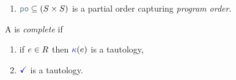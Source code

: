 \begin{definition}
\begin{enumerate}[,label=(\textsc{m}\arabic*),ref=\textsc{m}\arabic*]
\begin{multicols}{2}
\begin{enumerate}
    \item \label{pom-m-kappa} 
      if $\aEv\in\dmEvs$ then 
    \end{enumerate}
    \end{multicols}

  \item \label{pom-po} 
    ${\rpox} \subseteq (\umEvs\times\umEvs)$ is a partial order capturing
    \emph{program order}. %
  \end{enumerate}


  A \PwTpo{} is \emph{complete} if 
  \begin{multicols}{2}
    \begin{enumerate}[,label=(\textsc{c}\arabic*),ref=\textsc{c}\arabic*]

      \setcounter{enumi}{\value{Bkappa}}
    \item \label{top-kappa-c11}
      if $e\in R$ then ${\color{blue}\kappa}(e)$ is a tautology,


      \setcounter{enumi}{\value{Bterm}}
    \item \label{top-term-c11}
      $\aTerm$ is a tautology.
    \end{enumerate}
  \end{multicols}
\end{definition}
